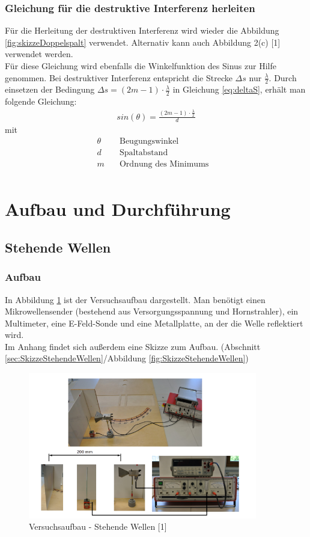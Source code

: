 \documentclass[a4paper]{scrartcl}
\numberwithin{equation}{subsection}
\begin{document}
\subsubsection{Gleichung für die destruktive Interferenz herleiten}
Für die Herleitung der destruktiven Interferenz wird wieder die Abbildung \ref{fig:skizzeDoppelspalt} verwendet. Alternativ kann auch Abbildung 2(c) [1] verwendet werden.\\
Für diese Gleichung wird ebenfalls die Winkelfunktion des Sinus zur Hilfe genommen. Bei destruktiver Interferenz entspricht die Strecke $\Delta s$ nur $\frac{\lambda}{2}$. Durch einsetzen der Bedingung $\Delta s = (2m-1) \cdot \frac{\lambda}{2}$ in Gleichung \ref{eq:deltaS}, erhält man folgende Gleichung:
\begin{align}
\label{eq:destrutiveInterferenz}
sin(\theta)=\frac{(2m-1) \cdot \frac{\lambda}{2}}{d}
\end{align}
mit
\begin{align*}
\theta \quad &\text{Beugungswinkel}&\\
d \quad &\text{Spaltabstand}&\\
m \quad &\text{Ordnung des Minimums}&\\
\end{align*}

\newpage

\section{Aufbau und Durchführung}
\subsection{Stehende Wellen}
\subsubsection{Aufbau}
In Abbildung \ref{fig:AufbauStehendeWellen} ist der Versuchsaufbau dargestellt. Man benötigt einen Mikrowellensender (bestehend aus Versorgungsspannung und Hornstrahler), ein Multimeter, eine E-Feld-Sonde und eine Metallplatte, an der die Welle reflektiert wird.\\
Im Anhang findet sich außerdem eine Skizze zum Aufbau. (Abschnitt \ref{sec:SkizzeStehendeWellen}/Abbildung \ref{fig:SkizzeStehendeWellen})

\begin{figure}[H]
\includegraphics[width=10cm]{Aufbau_Stehende_Wellen}
\centering
\caption{Versuchsaufbau - Stehende Wellen [1]}
\centering
\label{fig:AufbauStehendeWellen}
\end{figure}
\end{document}
